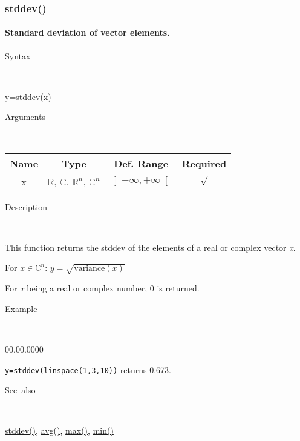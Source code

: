 \subsubsection*{\hypertarget{stddev}{}{\Large stddev()}}


\paragraph{\label{par:Standard-deviation}Standard deviation of vector elements.}

\begin{description}
\item [Syntax]~
\end{description}
y=stddev(x)

\begin{description}
\item [Arguments]~
\end{description}
\begin{tabular}{|c|c|c|c|}
\hline 
Name&
Type&
Def. Range&
Required\tabularnewline
\hline
\hline 
x&
$\mathbb{R}$, $\mathbb{C}$, $\mathbb{R}^{n}$, $\mathbb{C}^{n}$&
$\left]-\infty,+\infty\right[$&
$\surd$\tabularnewline
\hline
\end{tabular}

\begin{description}
\item [Description]~
\end{description}
This function returns the stddev of the elements of a real or complex
vector \textit{x}.

\medskip{}
For $x\in$$\mathbb{C}^{n}$: $y=$$\sqrt{\textrm{variance}(x)}$
\medskip{}

For \textit{x} being a real or complex number, 0 is returned.

\begin{description}
\item [Example]~
\end{description}
\begin{lyxlist}{00.00.0000}
\item [\texttt{y=stddev(linspace(1,3,10))}]returns 0.673.
\end{lyxlist}
\begin{description}
\item [See~also]~
\end{description}
\textcolor{blue}{\hyperlink{stddev}{stddev()}}\textcolor{black}{,}
\textcolor{blue}{\hyperlink{avg}{avg()}}\textcolor{black}{,} \textcolor{blue}{\hyperlink{max}{max()}}\textcolor{black}{,}
\textcolor{blue}{\hyperlink{min}{min()}}


